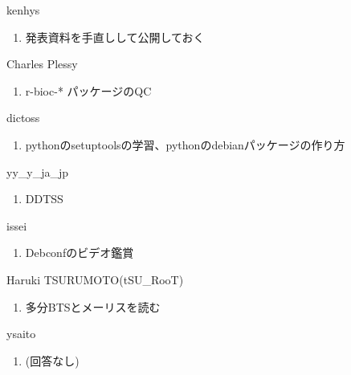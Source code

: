 \begin{prework}{ kenhys }
  \begin{enumerate}
  \item 発表資料を手直しして公開しておく
  \end{enumerate}
\end{prework}

\begin{prework}{ Charles Plessy }
  \begin{enumerate}
  \item r-bioc-* パッケージのQC
  \end{enumerate}
\end{prework}

\begin{prework}{ dictoss }
  \begin{enumerate}
  \item pythonのsetuptoolsの学習、pythonのdebianパッケージの作り方
  \end{enumerate}
\end{prework}

\begin{prework}{ yy\_y\_ja\_jp }
  \begin{enumerate}
  \item DDTSS
  \end{enumerate}
\end{prework}

\begin{prework}{ issei }
  \begin{enumerate}
  \item Debconfのビデオ鑑賞
  \end{enumerate}
\end{prework}

\begin{prework}{ Haruki TSURUMOTO(tSU\_RooT) }
  \begin{enumerate}
  \item 多分BTSとメーリスを読む
  \end{enumerate}
\end{prework}

\begin{prework}{ ysaito }
  \begin{enumerate}
  \item (回答なし)
  \end{enumerate}
\end{prework}
